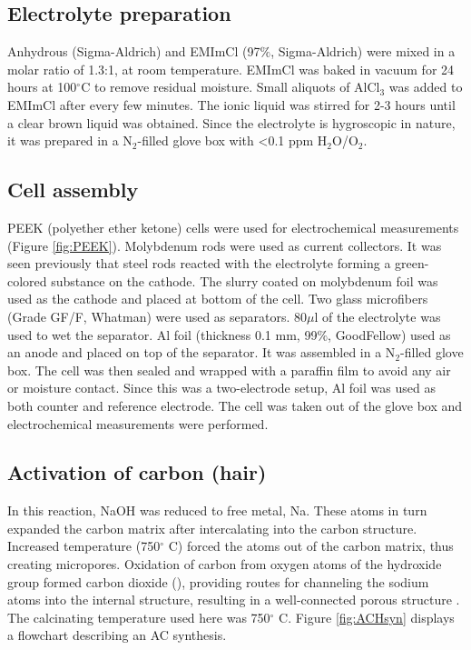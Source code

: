 \documentclass{article}
\begin{document}
\subsection{Electrolyte preparation}
Anhydrous  (Sigma-Aldrich) and EMImCl (97$\%$, Sigma-Aldrich) were mixed in a molar ratio of 1.3:1, at room temperature. EMImCl was baked in vacuum for 24 hours at 100$^{\circ}$C to remove residual moisture. Small aliquots of AlCl$_3$ was added to EMImCl after every few minutes. The ionic liquid was stirred for 2-3 hours until a clear brown liquid was obtained. Since the electrolyte is hygroscopic in nature, it was prepared in a N$_2$-filled glove box with <0.1 ppm H$_2$O/O$_2$. 

\subsection{Cell assembly}
PEEK (polyether ether ketone) cells were used for electrochemical measurements (Figure \ref{fig:PEEK}). Molybdenum rods were used as current collectors. It was seen previously that steel rods reacted with the electrolyte forming a green-colored substance on the cathode. The slurry coated on molybdenum foil was used as the cathode and placed at bottom of the cell. Two glass microfibers (Grade GF/F, Whatman) were used as separators. 80$\mu$l of the electrolyte was used to wet the separator. Al foil (thickness 0.1 mm, 99$\%$, GoodFellow) used as an anode and placed on top of the separator. It was assembled in a N$_2$-filled glove box. The cell was then sealed and wrapped with a paraffin film to avoid any air or moisture contact. Since this was a two-electrode setup, Al foil was used as both counter and reference electrode. The cell was taken out of the glove box and electrochemical measurements were performed. 

\subsection{Activation of carbon (hair)}
In this reaction, NaOH was reduced to free metal, Na. These atoms in turn expanded the carbon matrix after intercalating into the carbon structure. Increased temperature (750$^{\circ}$ C) forced the  atoms out of the carbon matrix, thus creating micropores. Oxidation of carbon from oxygen atoms of the hydroxide group formed carbon dioxide (), providing routes for channeling the sodium atoms into the internal structure, resulting in a well-connected porous structure \cite{satish_macroporous_2015}. The calcinating temperature used here was 750$^{\circ}$ C. Figure \ref{fig:ACHsyn} displays a flowchart describing an AC synthesis. 
\end{document}
